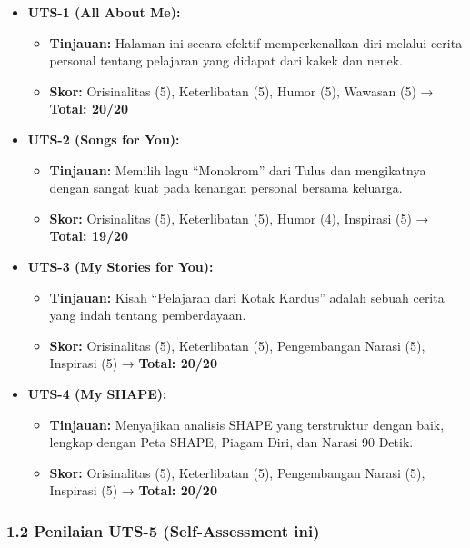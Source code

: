 \documentclass[
  letterpaper,
  DIV=11,
  numbers=noendperiod]{scrreprt}
\providecommand{\tightlist}{%
  \setlength{\itemsep}{0pt}\setlength{\parskip}{0pt}}
\begin{document}
\begin{itemize}
\tightlist
\item
  \textbf{UTS-1 (All About Me):}

  \begin{itemize}
  \tightlist
  \item
    \textbf{Tinjauan:} Halaman ini secara efektif memperkenalkan diri
    melalui cerita personal tentang pelajaran yang didapat dari kakek
    dan nenek.
  \item
    \textbf{Skor:} Orisinalitas (5), Keterlibatan (5), Humor (5),
    Wawasan (5) → \textbf{Total: 20/20}
  \end{itemize}
\item
  \textbf{UTS-2 (Songs for You):}

  \begin{itemize}
  \tightlist
  \item
    \textbf{Tinjauan:} Memilih lagu ``Monokrom'' dari Tulus dan
    mengikatnya dengan sangat kuat pada kenangan personal bersama
    keluarga.
  \item
    \textbf{Skor:} Orisinalitas (5), Keterlibatan (5), Humor (4),
    Inspirasi (5) → \textbf{Total: 19/20}
  \end{itemize}
\item
  \textbf{UTS-3 (My Stories for You):}

  \begin{itemize}
  \tightlist
  \item
    \textbf{Tinjauan:} Kisah ``Pelajaran dari Kotak Kardus'' adalah
    sebuah cerita yang indah tentang pemberdayaan.
  \item
    \textbf{Skor:} Orisinalitas (5), Keterlibatan (5), Pengembangan
    Narasi (5), Inspirasi (5) → \textbf{Total: 20/20}
  \end{itemize}
\item
  \textbf{UTS-4 (My SHAPE):}

  \begin{itemize}
  \tightlist
  \item
    \textbf{Tinjauan:} Menyajikan analisis SHAPE yang terstruktur dengan
    baik, lengkap dengan Peta SHAPE, Piagam Diri, dan Narasi 90 Detik.
  \item
    \textbf{Skor:} Orisinalitas (5), Keterlibatan (5), Pengembangan
    Narasi (5), Inspirasi (5) → \textbf{Total: 20/20}
  \end{itemize}
\end{itemize}

\subsubsection{1.2 Penilaian UTS-5 (Self-Assessment
ini)}\label{penilaian-uts-5-self-assessment-ini}
\end{document}
